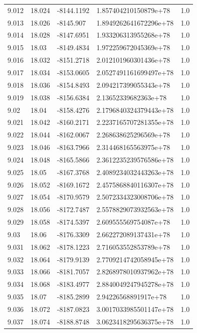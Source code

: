 \begin{tabular}{lllll}
9.012 & 18.024 & -8144.1192 & 1.857404210150879e+78 & 1.0 \\
9.013 & 18.026 & -8145.907 & 1.8949262641672296e+78 & 1.0 \\
9.014 & 18.028 & -8147.6951 & 1.933206313955268e+78 & 1.0 \\
9.015 & 18.03 & -8149.4834 & 1.972259672045369e+78 & 1.0 \\
9.016 & 18.032 & -8151.2718 & 2.012101960301436e+78 & 1.0 \\
9.017 & 18.034 & -8153.0605 & 2.0527491161699497e+78 & 1.0 \\
9.018 & 18.036 & -8154.8493 & 2.094217399055343e+78 & 1.0 \\
9.019 & 18.038 & -8156.6384 & 2.13652339682363e+78 & 1.0 \\
9.02 & 18.04 & -8158.4276 & 2.1796840324379443e+78 & 1.0 \\
9.021 & 18.042 & -8160.2171 & 2.2237165707281355e+78 & 1.0 \\
9.022 & 18.044 & -8162.0067 & 2.268638625296569e+78 & 1.0 \\
9.023 & 18.046 & -8163.7966 & 2.314468165563975e+78 & 1.0 \\
9.024 & 18.048 & -8165.5866 & 2.3612235239576586e+78 & 1.0 \\
9.025 & 18.05 & -8167.3768 & 2.4089234032443263e+78 & 1.0 \\
9.026 & 18.052 & -8169.1672 & 2.4575868840116307e+78 & 1.0 \\
9.027 & 18.054 & -8170.9579 & 2.5072334323008706e+78 & 1.0 \\
9.028 & 18.056 & -8172.7487 & 2.5578829073932563e+78 & 1.0 \\
9.029 & 18.058 & -8174.5397 & 2.609555569754087e+78 & 1.0 \\
9.03 & 18.06 & -8176.3309 & 2.662272089137431e+78 & 1.0 \\
9.031 & 18.062 & -8178.1223 & 2.716053552853789e+78 & 1.0 \\
9.032 & 18.064 & -8179.9139 & 2.7709214742058945e+78 & 1.0 \\
9.033 & 18.066 & -8181.7057 & 2.8268978010937962e+78 & 1.0 \\
9.034 & 18.068 & -8183.4977 & 2.8840049247945278e+78 & 1.0 \\
9.035 & 18.07 & -8185.2899 & 2.94226568891917e+78 & 1.0 \\
9.036 & 18.072 & -8187.0823 & 3.0017033985501147e+78 & 1.0 \\
9.037 & 18.074 & -8188.8748 & 3.0623418295636375e+78 & 1.0 \\

\end{tabular}
